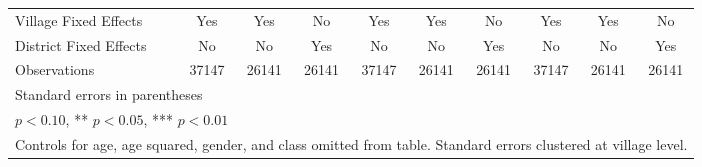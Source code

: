 \begin{sidewaystable}[htbp]
\begin{tabular}{l*{9}{c}}
Village Fixed Effects&      Yes   &      Yes   &       No   &      Yes   &      Yes   &       No   &      Yes   &      Yes   &       No   \\
District Fixed Effects&       No   &       No   &      Yes   &       No   &       No   &      Yes   &       No   &       No   &      Yes   \\
\midrule
Observations    &    37147   &    26141   &    26141   &    37147   &    26141   &    26141   &    37147   &    26141   &    26141   \\
\bottomrule
\multicolumn{10}{l}{\footnotesize Standard errors in parentheses}\\
\multicolumn{10}{l}{\footnotesize * \(p<0.10\), ** \(p<0.05\), *** \(p<0.01\)}\\
\multicolumn{10}{l}{\footnotesize Controls for age, age squared, gender, and class omitted from table. Standard errors clustered at village level.}\\
\end{tabular}
\end{sidewaystable}
